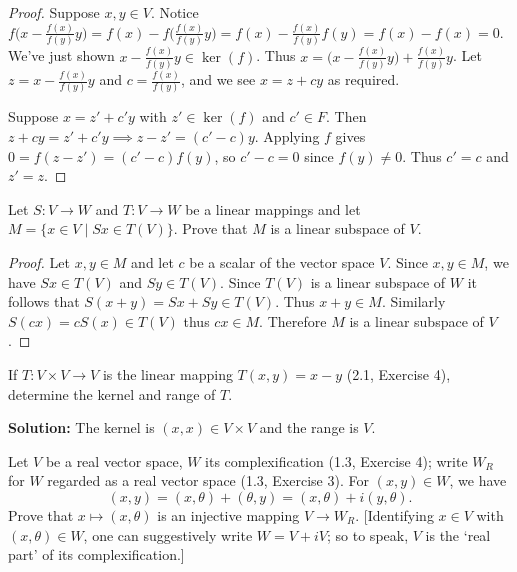 \begin{proof}
    Suppose $x, y \in V$.  
    Notice $f\Big(x - \frac{f(x)}{f(y)} y\Big) = f(x) - f\Big(\frac{f(x)}{f(y)} y\Big) = f(x) - \frac{f(x)}{f(y)} f(y) = f(x) - f(x) = 0$.  
    We've just shown $x - \frac{f(x)}{f(y)} y \in \ker(f)$.  
    Thus $x = \Big(x - \frac{f(x)}{f(y)} y\Big) + \frac{f(x)}{f(y)} y$.  
    Let $z = x - \frac{f(x)}{f(y)} y$ and $c = \frac{f(x)}{f(y)}$, and we see $x = z + cy$ as required.

    Suppose $x = z' + c'y$ with $z' \in \ker(f)$ and $c' \in F$.  
    Then $z + cy = z' + c'y \implies z - z' = (c' - c)y$.  
    Applying $f$ gives $0 = f(z - z') = (c' - c) f(y)$, so $c' - c = 0$ since $f(y) \ne 0$.  
    Thus $c' = c$ and $z' = z$.
\end{proof}

\begin{tcolorbox}[title=Problem 3, breakable]
    Let $S : V \longrightarrow W$ and $T : V \longrightarrow W$ be a linear mappings and let 
    $M = \{x \in V \mid Sx \in T(V)\}$. Prove that $M$ is a linear subspace of $V$.
\end{tcolorbox}

\begin{proof} 
    Let $x, y \in M$ and let $c$ be a scalar of the vector space $V$. 
    Since $x,y \in M$, we have $Sx \in T(V)$ and $Sy \in T(V)$. 
    Since $T(V)$ is a linear subspace of $W$ it follows that $S(x + y) = Sx + Sy \in T(V)$.
    Thus $x + y \in M$. 
    Similarly $S(cx) = cS(x) \in T(V)$ thus $cx \in M$. 
    Therefore $M$ is a linear subspace of $V$. 
\end{proof}

\begin{tcolorbox}[title=Problem 4, breakable]
    If $T : V \times V \longrightarrow V$ is the linear mapping 
    $T(x, y) = x - y$ (2.1, Exercise 4), determine the kernel and range of $T$.
\end{tcolorbox}

\textbf{Solution:} The kernel is $(x, x) \in V \times V$ and the range is $V$.

\begin{tcolorbox}[title=Problem 5, breakable]
    Let $V$ be a real vector space, $W$ its complexification (1.3, Exercise 4);
    write $W_R$ for $W$ regarded as a real vector space (1.3, Exercise 3).
    For $(x, y) \in W$, we have 
    \[(x, y) = (x, \theta) + (\theta, y) = (x, \theta) + i(y, \theta).\]
    Prove that $x \mapsto (x, \theta)$ is an injective mapping $V \longrightarrow W_R$.
    [Identifying $x \in V$ with $(x, \theta) \in W$, one can suggestively write 
    $W = V + iV$; so to speak, $V$ is the `real part' of its complexification.]
\end{tcolorbox}

